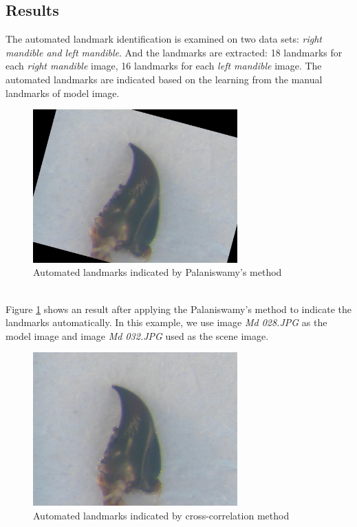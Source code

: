 \subsection{Results}
The automated landmark identification is examined on two data sets: \textit{right mandible and left mandible}. And the landmarks are extracted: 18 landmarks for each \textit{right mandible} image, 16 landmarks for each \textit{left mandible} image. The automated landmarks are indicated based on the learning from the manual landmarks of model image.
\begin{figure}[h!]
\centering
\includegraphics[width=0.7\textwidth]{./images/est32}
\caption{Automated landmarks indicated by Palaniswamy's method}
\label{fig:46}
\end{figure}~\\
Figure \ref{fig:46} shows an result after applying the Palaniswamy's method to indicate the landmarks automatically. In this example, we use image \textit{Md 028.JPG} as the model image and image \textit{Md 032.JPG} used as the scene image.\\
\begin{figure}[h!]
\centering
\includegraphics[width=0.7\textwidth]{./images/md32_cross}
\caption{Automated landmarks indicated by cross-correlation method}
\label{fig:461}
\end{figure}
